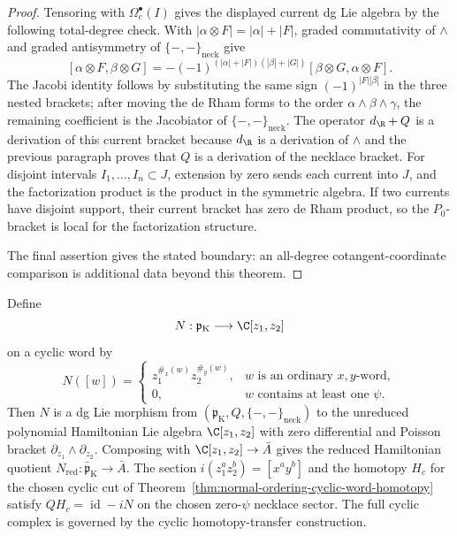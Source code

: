 \documentclass[11pt]{memoir}
\begin{document}
\begin{proof}
  Tensoring with \(\Omega_c^\bullet(I)\) gives the displayed current dg
  Lie algebra by the following total-degree check.  With
  \(|\alpha\otimes F|=|\alpha|+|F|\), graded commutativity of
  \(\wedge\) and graded antisymmetry of \(\{-,-\}_{\mathrm{neck}}\) give
  \[
    [\alpha\otimes F,\beta\otimes G]
      =
    -(-1)^{(|\alpha|+|F|)(|\beta|+|G|)}
      [\beta\otimes G,\alpha\otimes F].
  \]
  The Jacobi identity follows by substituting the same sign
  \((-1)^{|F||\beta|}\) in the three nested brackets; after moving the
  de Rham forms to the order \(\alpha\wedge\beta\wedge\gamma\), the
  remaining coefficient is the Jacobiator of
  \(\{-,-\}_{\mathrm{neck}}\).  The operator
  \(d_{\R}+Q\) is a derivation of this current bracket because
  \(d_{\R}\) is a derivation of \(\wedge\) and the previous paragraph
  proves that \(Q\) is a derivation of the necklace bracket.  For
  disjoint intervals \(I_1,\ldots,I_n\subset J\), extension by zero sends
  each current into \(J\), and the factorization product is the product
  in the symmetric algebra.  If two currents have disjoint
  support, their current bracket has zero de Rham product, so the
  \(P_0\)-bracket is local for the factorization structure.

  The final assertion gives the stated boundary: an
  all-degree cotangent-coordinate comparison is additional data beyond
  this theorem.
\end{proof}

\begin{prop}
\label{prop:normal-ordering-quotient-cyclic-koszul}
  Define
  \[
    N:\mathfrak p_{\mathrm K}\longrightarrow \C[z_1,z_2]
  \]
  on a cyclic word by
  \[
    N([w])=
    \begin{cases}
      z_1^{\#_x(w)}z_2^{\#_y(w)},& w\text{ is an ordinary }x,y\text{-word},\\
      0,& w\text{ contains at least one }\psi .
    \end{cases}
  \]
  Then \(N\) is a dg Lie morphism from
  \((\mathfrak p_{\mathrm K},Q,\{-,-\}_{\mathrm{neck}})\) to the
  unreduced polynomial Hamiltonian Lie algebra
	  \(\C[z_1,z_2]\) with zero differential and Poisson bracket
	  \(\partial_{z_1}\wedge\partial_{z_2}\).  Composing with
	  \(\C[z_1,z_2]\to\bar A\) gives the reduced Hamiltonian quotient
	  \(N_{\mathrm{red}}:\bar{\mathfrak p}_{\mathrm K}\to\bar A\).  The
	  section \(i(z_1^az_2^b)=[x^ay^b]\) and the homotopy \(H_c\) for the chosen cyclic cut
	  of Theorem~\ref{thm:normal-ordering-cyclic-word-homotopy}
	  satisfy \(QH_c=\operatorname{id}-iN\) on the chosen zero-\(\psi\)
	  necklace sector.  The full cyclic complex is governed by the
	  cyclic homotopy-transfer construction.
\end{prop}
\end{document}

